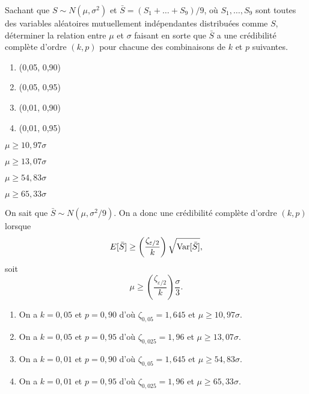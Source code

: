 \begin{exercice}
  Sachant que $S \sim N(\mu, \sigma^2)$ et $\bar{S} = (S_1 + \dots +
  S_9)/9$, où $S_1, \dots, S_9$ sont toutes des variables aléatoires
  mutuellement indépendantes distribuées comme $S$, déterminer la
  relation entre $\mu$ et $\sigma$ faisant en sorte que $\bar{S}$ a
  une crédibilité complète d'ordre $(k, p)$ pour chacune des
  combinaisons de $k$ et $p$ suivantes.
  \begin{enumerate}
  \item (0,05, 0,90)
  \item (0,05, 0,95)
  \item (0,01, 0,90)
  \item (0,01, 0,95)
  \end{enumerate}
  \begin{rep}
    \begin{inparaenum}
    \item $\mu \geq 10,97 \sigma$
    \item $\mu \geq 13,07 \sigma$
    \item $\mu \geq 54,83 \sigma$
    \item $\mu \geq 65,33 \sigma$
    \end{inparaenum}
  \end{rep}
  \begin{sol}
    On sait que $\bar{S} \sim N(\mu, \sigma^2/9)$. On a donc une
    crédibilité complète d'ordre $(k, p)$ lorsque
    \begin{displaymath}
      E [ \bar{S} ] \geq \left( \frac{\zeta_{\varepsilon/2}}{k} \right)
      \sqrt{\operatorname{Var} [ \bar{S} ]},
    \end{displaymath}
    soit
    \begin{displaymath}
      \mu \geq \left( \frac{\zeta_{\varepsilon/2}}{k} \right)
      \frac{\sigma}{3}.
    \end{displaymath}
    \begin{enumerate}
    \item On a $k = 0,05$ et $p = 0,90$ d'où $\zeta_{0,05} = 1,645$ et
      $\mu \geq 10,97 \sigma$.
    \item On a $k = 0,05$ et $p = 0,95$ d'où $\zeta_{0,025} = 1,96$ et
      $\mu \geq 13,07 \sigma$.
    \item On a $k = 0,01$ et $p = 0,90$ d'où $\zeta_{0,05} = 1,645$ et
      $\mu \geq 54,83 \sigma$.
    \item On a $k = 0,01$ et $p = 0,95$ d'où $\zeta_{0,025} = 1,96$ et
      $\mu \geq 65,33 \sigma$.
    \end{enumerate}
  \end{sol}
\end{exercice}

